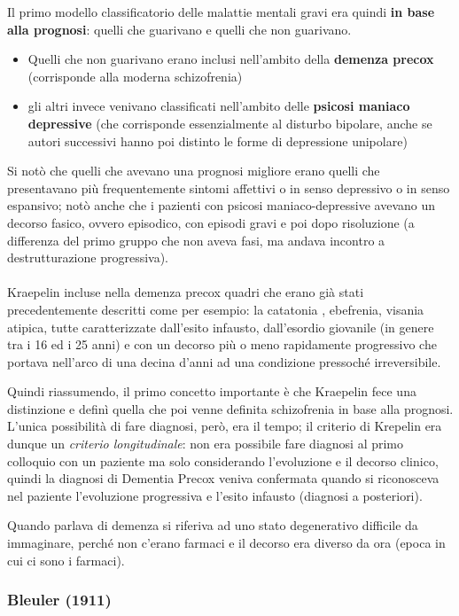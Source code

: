 Il primo modello classificatorio delle malattie mentali gravi era quindi
\textbf{in base alla prognosi}: quelli che guarivano e quelli che non
guarivano.

\begin{itemize}
\item
  Quelli che non guarivano erano inclusi nell'ambito della
  \textbf{demenza precox} (corrisponde alla moderna schizofrenia)
\item
  gli altri invece venivano classificati nell'ambito delle
  \textbf{psicosi maniaco depressive} (che corrisponde essenzialmente al
  disturbo bipolare, anche se autori successivi hanno poi distinto le
  forme di depressione unipolare)
\end{itemize}

Si notò che quelli che avevano una prognosi migliore erano quelli che
presentavano più frequentemente sintomi affettivi o in senso depressivo
o in senso espansivo; notò anche che i pazienti con psicosi
maniaco-depressive avevano un decorso fasico, ovvero episodico, con
episodi gravi e poi dopo risoluzione (a differenza del primo gruppo che
non aveva fasi, ma andava incontro a destrutturazione progressiva).
\\\\
Kraepelin incluse nella demenza precox quadri che erano già stati
precedentemente descritti come per esempio: la catatonia , ebefrenia,
visania atipica, tutte caratterizzate dall'esito infausto, dall'esordio
giovanile (in genere tra i 16 ed i 25 anni) e con un decorso più o meno
rapidamente progressivo che portava nell'arco di una decina d'anni ad
una condizione pressoché irreversibile.

Quindi riassumendo, il primo concetto importante è che Kraepelin fece
una distinzione e definì quella che poi venne definita schizofrenia in
base alla prognosi. L'unica possibilità di fare diagnosi, però, era il
tempo; il criterio di Krepelin era dunque un \emph{criterio
longitudinale}: non era possibile fare diagnosi al primo colloquio con
un paziente ma solo considerando l'evoluzione e il decorso clinico,
quindi la diagnosi di Dementia Precox veniva confermata quando si
riconosceva nel paziente l'evoluzione progressiva e l'esito infausto
(diagnosi a posteriori).

Quando parlava di demenza si riferiva ad uno stato degenerativo
difficile da immaginare, perché non c'erano farmaci e il decorso era
diverso da ora (epoca in cui ci sono i farmaci).

\subsubsection{Bleuler (1911)}

